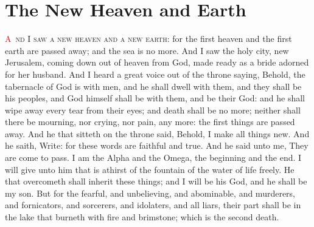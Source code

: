 
\chapter{The New Heaven and Earth}
\lettrine[lines=3,slope=-0.5em]{\textcolor{red}{A}}{\ nd I saw a new heaven and a new earth}: for the first heaven and the first earth are passed away; and the sea is no more. 
 And I saw the holy city, new Jerusalem, coming down out of heaven from God, made ready as a bride adorned for her husband. 
 And I heard a great voice out of the throne saying, Behold, the tabernacle of God is with men, and he shall dwell with them, and they shall be his peoples, and God himself shall be with them, and be their God: 
 and he shall wipe away every tear from their eyes; and death shall be no more; neither shall there be mourning, nor crying, nor pain, any more: the first things are passed away. 
 And he that sitteth on the throne said, Behold, I make all things new. And he saith, Write: for these words are faithful and true. 
 And he said unto me, They are come to pass. I am the Alpha and the Omega, the beginning and the end. I will give unto him that is athirst of the fountain of the water of life freely. 
 He that overcometh shall inherit these things; and I will be his God, and he shall be my son. 
 But for the fearful, and unbelieving, and abominable, and murderers, and fornicators, and sorcerers, and idolaters, and all liars, their part shall be in the lake that burneth with fire and brimstone; which is the second death.

